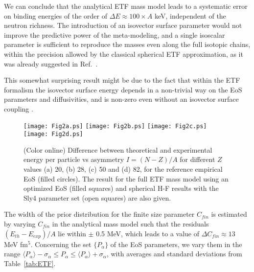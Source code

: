 \documentclass
[aps,prc,twocolumn,showpacs,showkeys,amsmath,floatfix,superscriptaddress]{revtex4}
\begin{document}
{{We can conclude that the analytical ETF mass model leads to 
a systematic error on binding energies of the order of $\Delta E \approx 100 \times A$ keV, independent of the neutron richness. 
The introduction of an isovector surface parameter would not improve the predictive power of the meta-modeling, and a single isoscalar parameter is sufficient to reproduce the masses even along the full isotopic chains, within the precision allowed by the classical spherical ETF approximation,
as it was already suggested in Ref.~\cite{bulgac15}.

This somewhat surprising result might be due to the fact that within the ETF formalism the isovector surface energy depends in a non-trivial way on the EoS parameters and diffusivities, and 
is non-zero even without an isovector surface coupling  \cite{Francois2}.
\\


\begin{figure}[htbp]
    \begin{center}
\texttt{[image: Fig2a.ps]}
\texttt{[image: Fig2b.ps]}
\texttt{[image: Fig2c.ps]}
\texttt{[image: Fig2d.ps]}
      \caption{(Color online) Difference between theoretical and experimental energy per particle vs asymmetry
 $I=(N-Z)/A$ for different $Z$ values (a) 20, (b) 28, (c) 50 and (d) 82, for the reference empirical EoS (filled circles). The result for the full ETF 
mass model using an optimized EoS (filled squares) and spherical H-F results with the Sly4 parameter set (open squares) are also given.
      }\label{fig:gasymbdiff_varyz}
      \end{center}
\end{figure}



The width of the prior distribution for  the finite size parameter $C_{fin}$ is estimated by varying $C_{fin}$ in the analytical mass model such that the residuals
$(E_{th}-E_{exp})/A$ lie within $\pm$ 0.5 MeV, which leads to a value of $\Delta C_{fin}\approx 13$ MeV fm$^5$. %
Concerning the set $\{P_\alpha\}$ of the EoS parameters, we vary them in the range $\langle{P}_\alpha\rangle -\sigma_\alpha \le P_\alpha \le \langle{P}_\alpha\rangle +\sigma_\alpha$, with averages and standard deviations from Table~\ref{tab:ETF}.



}}
\end{document}
